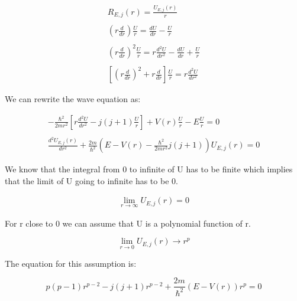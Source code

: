\begin{equation}
  \begin{array}{c}
    R_{E,j} (r) = \frac{U_{E,j}(r)}{r}
    \\

    \\
    \left(r\frac{d}{dr}\right)\frac{U}{r} = \frac{dU}{dr}-\frac{U}{r}
    \\

    \\
    \left(r\frac{d}{dr}\right)^2\frac{U}{r} = r\frac{d^2U}{dr^2}-\frac{dU}{dr}+\frac{U}{r}
    \\

    \\
    \left[\left(r\frac{d}{dr}\right)^2+r\frac{d}{dr}\right] \frac{U}{r} = r\frac{d^2U}{dr^2}
  \end{array}
\end{equation}

We can rewrite the wave equation as:

\begin{equation}
  \begin{array}{c}
    -\frac{\hbar^2}{2mr^2}\left[r\frac{d^2U}{dr^2}-j(j+1)\frac{U}{r}\right]+V(r)\frac{U}{r}-E\frac{U}{r} = 0
    \\

    \\
    \frac{d^2U_{E,j}(r)}{dr^2}+\frac{2m}{\hbar^2}\left(E-V(r)-\frac{\hbar^2}{2mr^2}j(j+1)\right)U_{E,j}(r) = 0
  \end{array}
\end{equation}

We know that the integral from 0 to infinite of U has to be finite which implies that the limit of U going to infinite has to be 0.

\begin{equation}
  \begin{array}{c}
    \lim_{r\to\infty} U_{E,j}(r) = 0
  \end{array}
\end{equation}

For r close to 0 we can assume that U is a polynomial function of r.

\begin{equation}
  \lim_{r\to 0} U_{E,j}(r) \to r^p
\end{equation}

The equation for this assumption is:

\begin{equation}
  p(p-1)r^{p-2} - j(j+1) r^{p-2} + \frac{2m}{\hbar^2}(E-V(r))r^p = 0
\end{equation}


